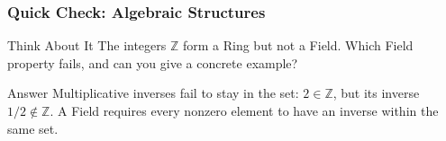 \begin{frame}[fragile]\frametitle{Quick Check: Algebraic Structures}
\begin{block}{Think About It}
The integers $\mathbb{Z}$ form a Ring but not a Field. Which Field property fails, and can you give a concrete example?
\end{block}
\pause
\begin{block}{Answer}
Multiplicative inverses fail to stay in the set: $2 \in \mathbb{Z}$, but its inverse $1/2 \notin \mathbb{Z}$. A Field requires every nonzero element to have an inverse within the same set.
\end{block}
\end{frame}